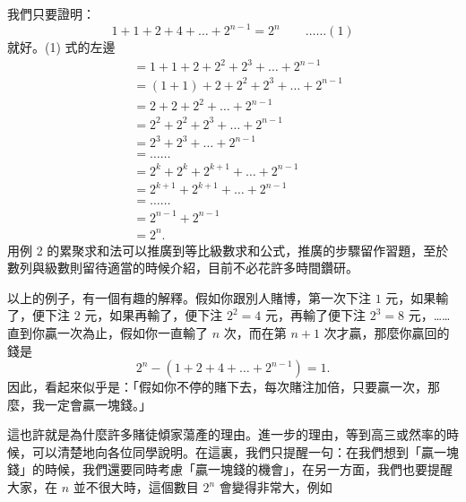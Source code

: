 我們只要證明：
\begin{equation*}
  1+1+2+4+\dots+2^{n-1} = 2^n \qquad \dots\dots (1)
\end{equation*}
就好。(1) 式的左邊
\begin{align*}
  &= 1+1+2+2^2+2^3+\dots+2^{n-1} \\
  &= (1+1)+2+2^2+2^3+\dots+2^{n-1} \\
  &= 2+2+2^2+\dots+2^{n-1} \\
  &= 2^2+2^2+2^3+\dots+2^{n-1} \\
  &= 2^3+2^3+\dots+2^{n-1} \\
  &= \dots\dots \\
  &= 2^k+2^k+2^{k+1}+\dots+2^{n-1} \\
  &= 2^{k+1}+2^{k+1}+\dots+2^{n-1} \\
  &= \dots\dots \\
  &= 2^{n-1}+2^{n-1} \\
  &= 2^n.
\end{align*}
用例 2 的累聚求和法可以推廣到等比級數求和公式，推廣的步驟留作習題，至於數列與級數則留待適當的時候介紹，目前不必花許多時間鑽研。

以上的例子，有一個有趣的解釋。假如你跟別人賭博，第一次下注 $1$ 元，如果輸了，便下注 $2$ 元，如果再輸了，便下注 $2^2=4$ 元，再輸了便下注 $2^3=8$ 元，……直到你贏一次為止，假如你一直輸了 $n$ 次，而在第 $n+1$ 次才贏，那麼你贏回的錢是
\begin{equation*}
  2^n - (1+2+4+\dots+2^{n-1}) = 1.
\end{equation*}
因此，看起來似乎是：「假如你不停的賭下去，每次賭注加倍，只要贏一次，那麼，我一定會贏一塊錢。」

這也許就是為什麼許多賭徒傾家蕩產的理由。進一步的理由，等到高三或然率的時候，可以清楚地向各位同學說明。在這裏，我們只提醒一句：在我們想到「贏一塊錢」的時候，我們還要同時考慮「贏一塊錢的機會」，在另一方面，我們也要提醒大家，在 $n$ 並不很大時，這個數目 $2^n$ 會變得非常大，例如

